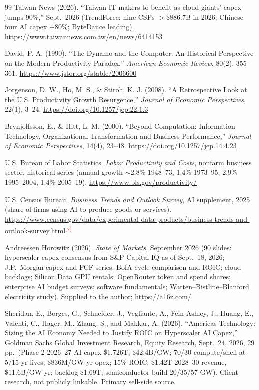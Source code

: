 \documentclass[11pt,letterpaper]{article}
\newcommand{\verify}{\textsuperscript{\textcolor{red}{[v]}}}
\begin{document}
\begin{thebibliography}{99}
Taiwan News (2026). ``Taiwan IT makers to benefit as cloud giants' capex jumps 90\%,'' Sept.~2026 (TrendForce: nine CSPs $>$\$886.7B in 2026; Chinese four AI capex +80\%; ByteDance leading). \url{https://www.taiwannews.com.tw/en/news/6414153}

David, P. A. (1990). ``The Dynamo and the Computer: An Historical Perspective on the Modern Productivity Paradox,'' \textit{American Economic Review}, 80(2), 355--361. \url{https://www.jstor.org/stable/2006600}

Jorgenson, D. W., Ho, M. S., \& Stiroh, K. J. (2008). ``A Retrospective Look at the U.S. Productivity Growth Resurgence,'' \textit{Journal of Economic Perspectives}, 22(1), 3--24. \url{https://doi.org/10.1257/jep.22.1.3}

Brynjolfsson, E., \& Hitt, L. M. (2000). ``Beyond Computation: Information Technology, Organizational Transformation and Business Performance,'' \textit{Journal of Economic Perspectives}, 14(4), 23--48. \url{https://doi.org/10.1257/jep.14.4.23}

U.S. Bureau of Labor Statistics. \textit{Labor Productivity and Costs}, nonfarm business sector, historical series (annual growth $\sim$2.8\% 1948--73, 1.4\% 1973--95, 2.9\% 1995--2004, 1.4\% 2005--19). \url{https://www.bls.gov/productivity/}

U.S. Census Bureau. \textit{Business Trends and Outlook Survey}, AI supplement, 2025 (share of firms using AI to produce goods or services). \url{https://www.census.gov/data/experimental-data-products/business-trends-and-outlook-survey.html}\verify

Andreessen Horowitz (2026). \textit{State of Markets}, September 2026 (90 slides: hyperscaler capex consensus from S\&P Capital IQ as of Sept.~18, 2026; J.P.~Morgan capex and FCF series; BofA cycle comparison and ROIC; cloud backlogs; Silicon Data GPU rentals; OpenRouter token and spend shares; enterprise AI budget surveys; software fundamentals; Watten--Bistline--Blanford electricity study). Supplied to the author; \url{https://a16z.com/}

Sheridan, E., Borges, G., Schneider, J., Vegliante, A., Fein-Ashley, J., Huang, E., Valenti, C., Hager, M., Zhang, S., and Makkar, A. (2026). ``Americas Technology: Sizing the AI Economy Needed to Justify ROIC on Hyperscaler AI Capex,'' Goldman Sachs Global Investment Research, Equity Research, Sept.~24, 2026, 29 pp.\ (Phase-2 2026--27 AI capex \$1.726T; \$42.4B/GW; 70/30 compute/shell at 5/15-yr lives; \$836M/GW-yr opex; 15\% ROIC; \$1.42T 2028--30 revenue, \$11.6B/GW-yr; backlog \$1.69T; semiconductor build 20/35/57 GW). Client research, not publicly linkable. Primary sell-side source.


\end{thebibliography}
\end{document}
